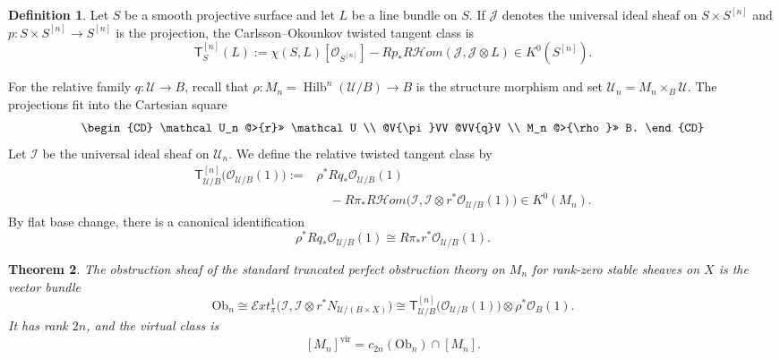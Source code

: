 \documentclass[12pt]{amsart}
\numberwithin{equation}{section}
\newcommand{\OO}{\mathcal{O}}
\newcommand{\Hilb}{\operatorname{Hilb}}
\newcommand{\Ttw}{\mathsf{T}}
\newcommand{\vfc}[1]{[#1]^{\mathrm{vir}}}
\theoremstyle{plain}
\newtheorem{theorem}{Theorem}[section]
\theoremstyle{definition}
\newtheorem{definition}[theorem]{Definition}
\theoremstyle{remark}
\begin{document}
\begin{definition}\label{def:twisted-tangent-relative}
Let $S$ be a smooth projective surface and let $L$ be a line bundle on $S$.
If $\mathcal J$ denotes the universal ideal sheaf on $S\times S^{[n]}$ and $p\colon S\times S^{[n]}\to S^{[n]}$ is the projection, the Carlsson--Okounkov twisted tangent class is
\begin{equation}\label{eq:def-twisted-tangent}
\Ttw_S^{[n]}(L):= \chi(S,L)[\mathcal{O}_{S^{[n]}}] - Rp_*R\mathcal Hom(\mathcal J,\mathcal J\otimes L)\in K^0(S^{[n]}).
\end{equation}

For the relative family $q\colon \mathcal U\to B$, recall that $\rho\colon M_n=\Hilb^n(\mathcal U/B)\to B$ is the structure morphism and set $\mathcal U_n=M_n\times_B\mathcal U$.
The projections fit into the Cartesian square
\[
\begin{CD}
\mathcal U_n @>{r}>> \mathcal U \\
@V{\pi}VV @VV{q}V \\
M_n @>{\rho}>> B.
\end{CD}
\]
Let $\mathcal I$ be the universal ideal sheaf on $\mathcal U_n$.
We define the relative twisted tangent class by
\begin{equation}\label{eq:def-relative-twisted}
\begin{aligned}
\Ttw_{\mathcal U/B}^{[n]}\bigl(\OO_{\mathcal U/B}(1)\bigr)
:={}&\rho^*Rq_*\OO_{\mathcal U/B}(1) \\
&\quad-R\pi_*R\mathcal Hom\bigl(\mathcal I,\mathcal I\otimes r^*\OO_{\mathcal U/B}(1)\bigr)
\in K^0(M_n).
\end{aligned}
\end{equation}
By flat base change, there is a canonical identification
\[
\rho^*Rq_*\OO_{\mathcal U/B}(1)
\cong R\pi_*r^*\OO_{\mathcal U/B}(1).
\]
\end{definition}

\begin{theorem}\label{thm:obstruction-bundle}
The obstruction sheaf of the standard truncated perfect obstruction theory on $M_n$ for rank-zero stable sheaves on $X$ is the vector bundle
\begin{equation}\label{eq:ob-bundle}
\mathrm{Ob}_n\cong
\mathcal Ext^1_{\pi}\bigl(\mathcal I,\mathcal I\otimes r^*N_{\mathcal U/(B\times X)}\bigr)
\cong
\Ttw_{\mathcal U/B}^{[n]}\bigl(\OO_{\mathcal U/B}(1)\bigr)\otimes \rho^*\OO_B(1).
\end{equation}
It has rank $2n$, and the virtual class is
\begin{equation}\label{eq:virtual-class-top-chern}
\vfc{M_n}=c_{2n}(\mathrm{Ob}_n)\cap [M_n].
\end{equation}
\end{theorem}
\end{document}
